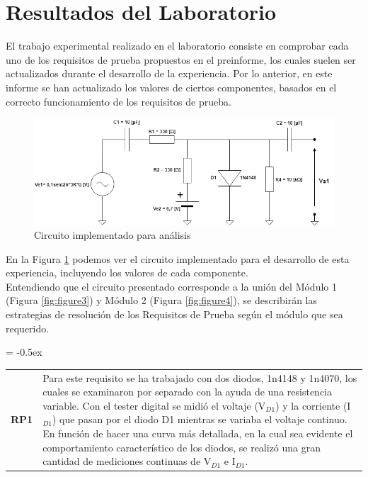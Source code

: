 \section{Resultados del Laboratorio}

El trabajo experimental realizado en el laboratorio consiste en comprobar cada uno de los requisitos de prueba propuestos en el preinforme, los cuales suelen ser actualizados durante el desarrollo de la experiencia. Por lo anterior, en este informe se han actualizado los valores de ciertos componentes, basados en el correcto funcionamiento de los requisitos de prueba.

\vspace{0.4cm}

\begin{figure}[h]
    \Centering
    \includegraphics[scale=0.57]{Imagenes/7Resultados/circuites-inf3.png}
    \caption{Circuito implementado para análisis}
	\label{fig:figure9}
\end{figure}

\vspace{.4 cm}
En la Figura \ref{fig:figure9} podemos ver el circuito implementado para el desarrollo de esta experiencia, incluyendo los valores de cada componente.\\
Entendiendo que el circuito presentado corresponde a la unión del Módulo 1 (Figura \ref{fig:figure3}) y Módulo 2 (Figura \ref{fig:figure4}), se describirán las estrategias de resolución de los Requisitos de Prueba según el módulo que sea requerido.
\vspace{.2 cm}

\centering
\extrarowheight = -0.5ex
\renewcommand{\arraystretch}{2.25}
\begin{tabular}{p{} p{}}

\textbf{RP1} & Para este requisito se ha trabajado con dos diodos, 1n4148 y 1n4070, los cuales se examinaron por separado con la ayuda de una resistencia variable. Con el tester digital se midió el voltaje (V$_{D1}$) y la corriente (I$_{D1}$) que pasan por el diodo D1 mientras se variaba el voltaje continuo. En función de hacer una curva más detallada, en la cual sea evidente el comportamiento característico de los diodos, se realizó una gran cantidad de mediciones continuas de V$_{D1}$ e I$_{D1}$.  %
\\ 

\end{tabular}


